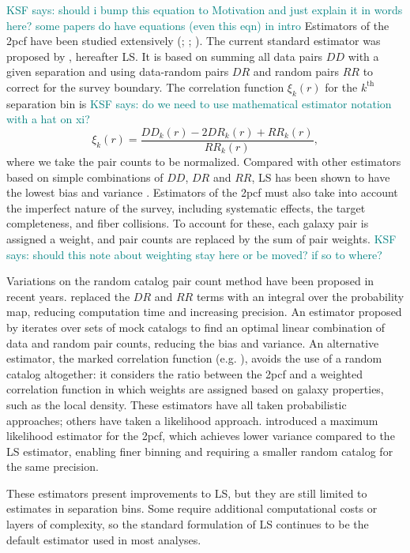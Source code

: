 \documentclass[modern]{aastex62}
\newcommand{\cf}{2pcf\xspace} %
\newcommand{\LS}{LS\xspace}
\newcommand{\KSF}[1]{\textcolor{teal}{KSF says: #1}}
\begin{document}
\KSF{should i bump this equation to Motivation and just explain it in words here? some papers do have equations (even this eqn) in intro}
Estimators of the \cf have been studied extensively (\citealt{PeeblesHauser1974}; \citealt{DavisPeebles1983}; \citealt{Hamilton1993}).
The current standard estimator was proposed by \cite{LandySzalay1993}, hereafter \LS. It is based on summing all data pairs $DD$ with a given separation and using data-random pairs $DR$ and random pairs $RR$ to correct for the survey boundary. The correlation function $\xi_k(r)$ for the $k^\mathrm{th}$ separation bin is
\KSF{do we need to use mathematical estimator notation with a hat on xi?}
\begin{equation}
\xi_k(r) = \frac{DD_k(r) - 2DR_k(r) + RR_k(r)}{RR_k(r)},
\end{equation}
where we take the pair counts to be normalized.
Compared with other estimators based on simple combinations of $DD$, $DR$ and $RR$, \LS has been shown to have the lowest bias and variance \citep{Kerscher2000}.
Estimators of the \cf must also take into account the imperfect nature of the survey, including systematic effects, the target completeness, and fiber collisions.
To account for these, each galaxy pair is assigned a weight, and pair counts are replaced by the sum of pair weights.
\KSF{should this note about weighting stay here or be moved? if so to where?}

Variations on the random catalog pair count method have been proposed in recent years.
\cite{Demina2016} replaced the $DR$ and $RR$ terms with an integral over the probability map, reducing computation time and increasing precision.
An estimator proposed by \cite{VargasMagana2013} iterates over sets of mock catalogs to find an optimal linear combination of data and random pair counts, reducing the bias and variance.
An alternative estimator, the marked correlation function (e.g. \citealt{WhitePadmanabhan2009}), avoids the use of a random catalog altogether: it considers the ratio between the \cf and a weighted correlation function in which weights are assigned based on galaxy properties, such as the local density.
These estimators have all taken probabilistic approaches; others have taken a likelihood approach.
\cite{BaxterRozo2013} introduced a maximum likelihood estimator for the \cf, which achieves lower variance compared to the \LS estimator, enabling finer binning and requiring a smaller random catalog for the same precision.

These estimators present improvements to \LS, but they are still limited to estimates in separation bins.
Some require additional computational costs or layers of complexity, so the standard formulation of \LS continues to be the default estimator used in most analyses.
\end{document}
